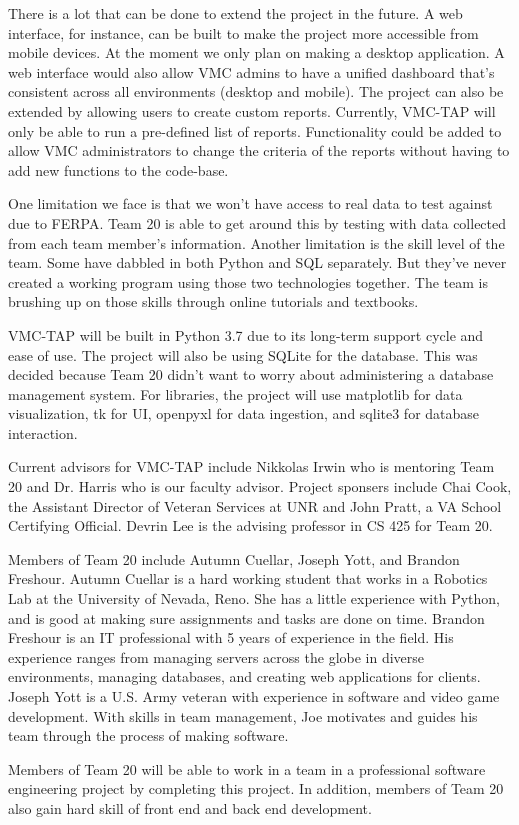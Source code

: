 There is a lot that can be done to extend the project in the future. A web interface, for instance, can be built to make the project more accessible from mobile devices. At the moment we only plan on making a desktop application. A web interface would also allow VMC admins to have a unified dashboard that’s consistent across all environments (desktop and mobile). The project can also be extended by allowing users to create custom reports. Currently, VMC-TAP will only be able to run a pre-defined list of reports. Functionality could be added to allow VMC administrators to change the criteria of the reports without having to add new functions to the code-base.

One limitation we face is that we won’t have access to real data to test against due to FERPA. Team 20 is able to get around this by testing with data collected from each team member’s information. Another limitation is the skill level of the team. Some have dabbled in both Python and SQL separately.  But they’ve never created a working program using those two technologies together. The team is brushing up on those skills through online tutorials and textbooks.

VMC-TAP will be built in Python 3.7 due to its long-term support cycle and ease of use. The project will also be using SQLite for the database. This was decided because Team 20 didn't want to worry about administering a database management system. For libraries, the project will use matplotlib for data visualization, tk for UI, openpyxl for data ingestion, and sqlite3 for database interaction. 

Current advisors for VMC-TAP include Nikkolas Irwin who is mentoring Team 20 and Dr. Harris who is our faculty advisor. Project sponsers include Chai Cook, the Assistant Director of Veteran Services at UNR and John Pratt, a VA School Certifying Official. Devrin Lee is the advising professor in CS 425 for Team 20.

Members of Team 20 include Autumn Cuellar, Joseph Yott, and Brandon Freshour. Autumn Cuellar is a hard working student that works in a Robotics Lab at the University of Nevada, Reno. She has a little experience with Python, and is good at making sure assignments and tasks are done on time. Brandon Freshour is an IT professional with 5 years of experience in the field. His experience ranges from managing servers across the globe in diverse environments, managing databases, and creating web applications for clients. Joseph Yott is a U.S. Army veteran with experience in software and video game development. With skills in team management, Joe motivates and guides his team through the process of making software. 

Members of Team 20 will be able to work in a team in a professional software engineering project by completing this project. In addition, members of Team 20 also gain hard skill of front end and back end development. 





